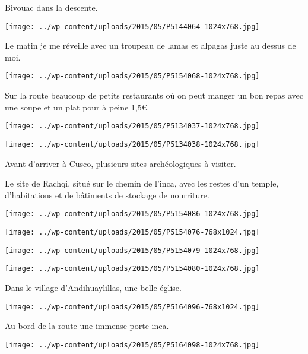 Bivouac dans la descente. 
\begin{center} \texttt{[image: ../wp-content/uploads/2015/05/P5144064-1024x768.jpg]} \end{center}

Le matin je me réveille avec un troupeau de lamas et alpagas juste au dessus de moi. 
\begin{center} \texttt{[image: ../wp-content/uploads/2015/05/P5154068-1024x768.jpg]} \end{center}
\pagebreak

Sur la route beaucoup de petits restaurants où on peut manger un bon repas avec une soupe et un plat pour à peine 1,5€. 
\begin{center} \texttt{[image: ../wp-content/uploads/2015/05/P5134037-1024x768.jpg]} \end{center}
\begin{center} \texttt{[image: ../wp-content/uploads/2015/05/P5134038-1024x768.jpg]} \end{center}
\pagebreak

Avant d'arriver à Cusco, plusieurs sites archéologiques à visiter.

Le site de Rachqi, situé sur le chemin de l'inca, avec les restes d'un temple, d'habitations et de bâtiments de stockage de nourriture. 
\begin{center} \texttt{[image: ../wp-content/uploads/2015/05/P5154086-1024x768.jpg]} \end{center}
\begin{center} \texttt{[image: ../wp-content/uploads/2015/05/P5154076-768x1024.jpg]} \end{center}

\begin{center} \texttt{[image: ../wp-content/uploads/2015/05/P5154079-1024x768.jpg]} \end{center}
\begin{center} \texttt{[image: ../wp-content/uploads/2015/05/P5154080-1024x768.jpg]} \end{center}
\pagebreak

Dans le village d'Andihuaylillas, une belle église. 
\begin{center} \texttt{[image: ../wp-content/uploads/2015/05/P5164096-768x1024.jpg]} \end{center}

Au bord de la route une immense porte inca. 
\begin{center} \texttt{[image: ../wp-content/uploads/2015/05/P5164098-1024x768.jpg]} \end{center}
\pagebreak


